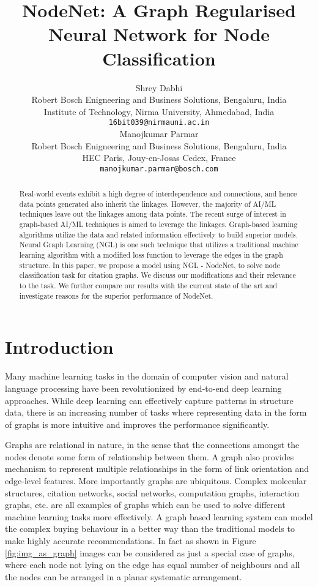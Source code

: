\documentclass{article}
\title{NodeNet: A Graph Regularised Neural Network for Node Classification}
\author{Shrey Dabhi\\
    Robert Bosch Enigneering and Business Solutions, Bengaluru, India\\
    Institute of Technology, Nirma University, Ahmedabad, India\\
    \texttt{16bit039@nirmauni.ac.in}\\
    \And
    Manojkumar Parmar\\
    Robert Bosch Enigneering and Business Solutions, Bengaluru, India\\
    HEC Paris, Jouy-en-Josas Cedex, France\\
    \texttt{manojkumar.parmar@bosch.com}\\
}
\begin{document}
\maketitle

\begin{abstract}
    Real-world events exhibit a high degree of interdependence and connections, and hence data points generated also inherit the linkages. However, the majority of AI/ML techniques leave out the linkages among data points. The recent surge of interest in graph-based AI/ML techniques is aimed to leverage the linkages. Graph-based learning algorithms utilize the data and related information effectively to build superior models. Neural Graph Learning (NGL) is one such technique that utilizes a traditional machine learning algorithm with a modified loss function to leverage the edges in the graph structure. In this paper, we propose a model using NGL - NodeNet, to solve node classification task for citation graphs. We discuss our modifications and their relevance to the task. We further compare our results with the current state of the art and investigate reasons for the superior performance of NodeNet.
\end{abstract}

\section{Introduction}

Many machine learning tasks in the domain of computer vision and natural language processing have been revolutionized by end-to-end deep learning approaches. While deep learning can effectively capture patterns in structure data, there is an increasing number of tasks where representing data in the form of graphs is more intuitive and improves the performance significantly.

Graphs are relational in nature, in the sense that the connections amongst the nodes denote some form of relationship between them. A graph also provides mechanism to represent multiple relationships in the form of link orientation and edge-level features. More importantly graphs are ubiquitous. Complex molecular structures, citation networks, social networks, computation graphs, interaction graphs, etc. are all examples of graphs which can be used to solve different machine learning tasks more effectively. A graph based learning system can model the complex buying behaviour in a better way than the traditional models to make highly accurate recommendations. In fact as shown in Figure \ref{fig:img_as_graph} images can be considered as just a special case of graphs, where each node not lying on the edge has equal number of neighbours and all the nodes can be arranged in a planar systematic arrangement.
\end{document}
